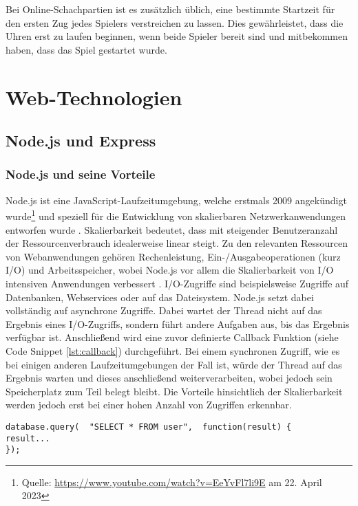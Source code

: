 Bei Online-Schachpartien ist es zusätzlich üblich, eine bestimmte Startzeit für den ersten Zug jedes Spielers verstreichen zu lassen. Dies gewährleistet, dass die Uhren erst zu laufen beginnen, wenn beide Spieler bereit sind und mitbekommen haben, dass das Spiel gestartet wurde.

    \section{Web-Technologien}
        \subsection{Node.js und Express}
        \subsubsection{Node.js und seine Vorteile}
        \label{sec:node.js}
Node.js ist eine JavaScript-Laufzeitumgebung, welche erstmals 2009 angekündigt wurde\footnote{Quelle: \url{https://www.youtube.com/watch?v=EeYvFl7li9E} am 22. April 2023} und speziell für die Entwicklung von skalierbaren Netzwerkanwendungen entworfen wurde \cite{nodejs}. Skalierbarkeit bedeutet, dass mit steigender Benutzeranzahl der Ressourcenverbrauch idealerweise linear steigt. Zu den relevanten Ressourcen von Webanwendungen gehören Rechenleistung, Ein-/Ausgabeoperationen (kurz I/O) und Arbeitsspeicher, wobei Node.js vor allem die Skalierbarkeit von I/O intensiven Anwendungen verbessert \cite{nodejsbook}.
I/O-Zugriffe sind beispielsweise Zugriffe auf Datenbanken, Webservices oder auf das Dateisystem. Node.js setzt dabei vollständig auf asynchrone Zugriffe. Dabei wartet der Thread nicht auf das Ergebnis eines I/O-Zugriffs, sondern führt andere Aufgaben aus, bis das Ergebnis verfügbar ist. Anschließend wird eine zuvor definierte Callback Funktion (siehe Code Snippet \ref{lst:callback}) durchgeführt. Bei einem synchronen Zugriff, wie es bei einigen anderen Laufzeitumgebungen der Fall ist, würde der Thread auf das Ergebnis warten und dieses anschließend weiterverarbeiten, wobei jedoch sein Speicherplatz zum Teil belegt bleibt.\cite{nodejsbook} Die Vorteile hinsichtlich der Skalierbarkeit werden jedoch erst bei einer hohen Anzahl von Zugriffen erkennbar.

\begin{lstlisting}[style=codeStyle, caption={Beispiel einer Callback Funktion \textbf{Quelle: } \cite{nodejsbook}}, label={lst:callback}]
database.query(  "SELECT * FROM user",  function(result) {
result...
});
\end{lstlisting}


